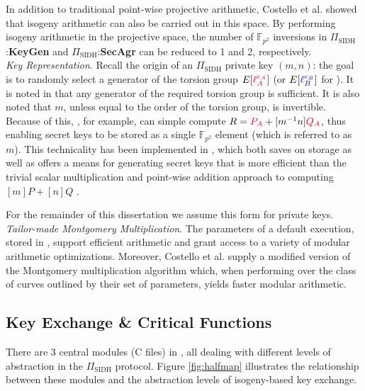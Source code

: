 In addition to traditional point-wise projective arithmetic, Costello et al. showed that isogeny arithmetic can also be carried out in this space. By performing isogeny arithmetic in the projective space, the number of $\mathbb{F}_{p^2}$ inversions in $\Pi_{\text{SIDH}}$:\textbf{KeyGen} and $\Pi_{\text{SIDH}}$:\textbf{SecAgr} can be reduced to 1 and 2, respectively.\\

\noindent
\emph{Key Representation}. Recall the origin of an $\Pi_{\text{SIDH}}$ private key $(m, n)$: the goal is to randomly select a generator of the torsion group $E[\textcolor{red}{\ell_{A}^{e_A}}]$ (or $E[\textcolor{blue}{\ell_{B}^{e_B}}]$ for \bob). It is noted in \cite{djp} that any generator of the required torsion group is sufficient. It is also noted that $m$, unless equal to the order of the torsion group, is invertible. Because of this, \alice, for example, can simple compute $R = \textcolor{red}{P_A} + [m^{-1}n]\textcolor{red}{Q_A}$, thus enabling secret keys to be stored as a single $\mathbb{F}_{p^2}$ element (which is referred to as $m$). This technicality has been implemented in \sidh, which both saves on storage as well as offers a means for generating secret keys that is more efficient than the trivial scalar multiplication and point-wise addition approach to computing $[m]P + [n]Q$ \cite{effalg}.

For the remainder of this dissertation we assume this form for private keys.\\

\noindent
\emph{Tailor-made Montgomery Multiplication}. The parameters of a default \sidh execution, stored in , support efficient arithmetic and grant access to a variety of modular arithmetic optimizations. Moreover, Costello et al. supply a modified version of the Montgomery multiplication algorithm which, when performing over the class of curves outlined by their set of parameters, yields faster modular arithmetic.  

\subsection{Key Exchange \& Critical Functions}
\label{subsec:functions}

There are 3 central modules (C files) in \sidh, all dealing with different levels of abstraction in the $\Pi_{\text{SIDH}}$ protocol.  Figure \ref{fig:halfmap} illustrates the relationship between these modules and the abstraction levels of isogeny-based key exchange.

